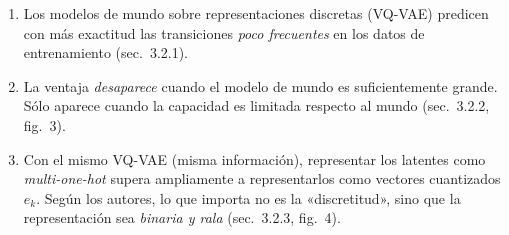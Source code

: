 \documentclass[11pt,a4paper]{article}
\begin{document}
\begin{evidencia}
\begin{enumerate}[leftmargin=*]
  \item Los modelos de mundo sobre representaciones discretas (VQ-VAE) predicen con más exactitud las transiciones \emph{poco frecuentes} en los datos de entrenamiento (sec.~3.2.1).
  \item La ventaja \emph{desaparece} cuando el modelo de mundo es suficientemente grande. Sólo aparece cuando la capacidad es limitada respecto al mundo (sec.~3.2.2, fig.~3).
  \item Con el mismo VQ-VAE (misma información), representar los latentes como \emph{multi-one-hot} supera ampliamente a representarlos como vectores cuantizados $e_k$. Según los autores, lo que importa no es la «discretitud», sino que la representación sea \emph{binaria y rala} (sec.~3.2.3, fig.~4).
\end{enumerate}
\end{evidencia}
\end{document}
